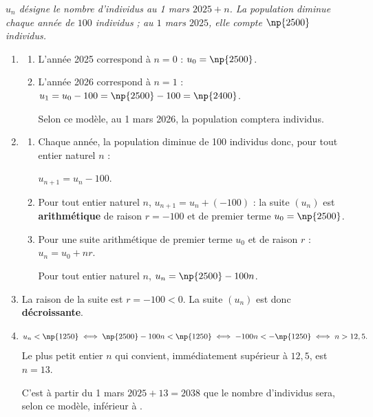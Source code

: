 \emph{$u_n$ désigne le nombre d'individus au 1 mars $2025+n$. La population diminue
chaque année de $100$ individus ; au $1$ mars $2025$, elle compte $\np{2500}$ individus.}

\begin{enumerate}
	\item
	\begin{enumerate}
		\item L'année 2025 correspond à $n = 0$ : $u_0 = \np{2500}$.

		\item L'année 2026 correspond à $n = 1$ :
		$u_1 = u_0 - 100 = \np{2500} - 100 = \np{2400}$.

		Selon ce modèle, au 1 mars 2026, la population comptera  individus.
	\end{enumerate}

	\item
	\begin{enumerate}
		\item Chaque année, la population diminue de 100 individus donc, pour tout entier naturel $n$ :
		
		$u_{n+1} = u_n - 100$.

		\item Pour tout entier naturel $n$, $u_{n+1} = u_n + (-100)$ : la suite $(u_n)$ est
		\textbf{arithmétique} de raison $r = -100$ et de premier terme $u_0 = \np{2500}$.

		\item Pour une suite arithmétique de premier terme $u_0$ et de raison $r$ :
		$u_n = u_0 + nr$.

		Pour tout entier naturel $n$, $u_n = \np{2500} - 100n$.
	\end{enumerate}

	\item La raison de la suite est $r = -100 < 0$. La suite $(u_n)$ est donc \textbf{décroissante}.

	\item
	\[u_n < \np{1250} \iff \np{2500} - 100n < \np{1250} \iff -100n < -\np{1250} \iff n > 12,5.\]
	Le plus petit entier $n$ qui convient, immédiatement supérieur à $12,5$,  est $n = 13$.

	C'est à partir du 1 mars $2025 + 13 = 2038$ que le nombre d'individus
	sera, selon ce modèle, inférieur à .
\end{enumerate}

\medskip
